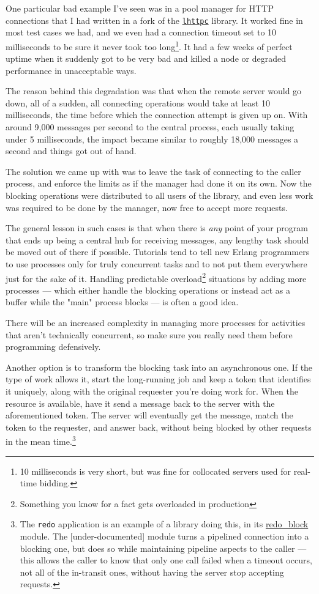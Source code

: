 \documentclass[11pt, oneside]{book}   	%
\newcommand{\otpapp}[1]{\Verb`#1`}
\newcommand{\module}[1]{\Verb`#1`}
\begin{document}
One particular bad example I've seen was in a pool manager for HTTP connections that I had written in a fork of the \href{https://github.com/ferd/lhttpc}{\module{lhttpc}} library. It worked fine in most test cases we had, and we even had a connection timeout set to 10 milliseconds to be sure it never took too long\footnote{10 milliseconds is very short, but was fine for collocated servers used for real-time bidding.}. It had a few weeks of perfect uptime when it suddenly got to be very bad and killed a node or degraded performance in unacceptable ways.

The reason behind this degradation was that when the remote server would go down, all of a sudden, all connecting operations would take at least 10 milliseconds, the time before which the connection attempt is given up on. With around 9,000 messages per second to the central process, each usually taking under 5 milliseconds, the impact became similar to roughly 18,000 messages a second and things got out of hand.

The solution we came up with was to leave the task of connecting to the caller process, and enforce the limits as if the manager had done it on its own. Now the blocking operations were distributed to all users of the library, and even less work was required to be done by the manager, now free to accept more requests.

The general lesson in such cases is that when there is \emph{any} point of your program that ends up being a central hub for receiving messages, any lengthy task should be moved out of there if possible. Tutorials tend to tell new Erlang programmers to use processes only for truly concurrent tasks and to not put them everywhere just for the sake of it. Handling predictable overload\footnote{Something you know for a fact gets overloaded in production} situations by adding more processes — which either handle the blocking operations or instead act as a buffer while the "main" process blocks — is often a good idea.

There will be an increased complexity in managing more processes for activities that aren't technically concurrent, so make sure you really need them before programming defensively.

Another option is to transform the blocking task into an asynchronous one. If the type of work allows it, start the long-running job and keep a token that identifies it uniquely, along with the original requester you're doing work for. When the resource is available, have it send a message back to the server with the aforementioned token. The server will eventually get the message, match the token to the requester, and answer back, without being blocked by other requests in the mean time.\footnote{The \otpapp{redo} application is an example of a library doing this, in its \href{https://github.com/heroku/redo/blob/master/src/redo\_block.erl}{redo\_block} module. The [under-documented] module turns a pipelined connection into a blocking one, but does so while maintaining pipeline aspects to the caller — this allows the caller to know that only one call failed when a timeout occurs, not all of the in-transit ones, without having the server stop accepting requests.}
\end{document}

